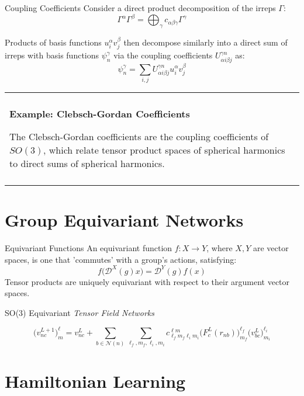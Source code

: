 \documentclass[11pt]{beamer}
\newenvironment{boxed2}
    {\begin{center}
    \begin{tabular}{|p{0.95\textwidth}|}
    \hline\\
    }
    { 
    \\\\\hline
    \end{tabular} 
    \end{center}
    }
\begin{document}
\begin{frame}{Coupling Coefficients}
Consider a direct product decomposition of the irreps $\Gamma$:
$$
\Gamma^{\alpha}\Gamma^{\beta}=\bigoplus_{\gamma}c_{\alpha\beta\gamma}\Gamma^{\gamma}
$$
	
Products of basis functions $u^{\alpha}_iv^{\beta}_j$ then decompose similarly into a direct sum of irreps with basis functions $\psi_{n}^{\gamma}$ via the coupling coefficients $U_{\alpha i \beta j}^{\gamma n}$ as:
$$
\psi_{n}^{\gamma}= \sum_{i,j}U_{\alpha i \beta j}^{\gamma n}u^{\alpha}_iv^{\beta}_j
$$

	\begin{boxed2}
	
	\vspace{-.41cm}
	
	\textbf{Example: Clebsch-Gordan Coefficients} 
	
	The Clebsch-Gordan coefficients are the coupling coefficients of $SO(3)$, which relate tensor product spaces of spherical harmonics to direct sums of spherical harmonics.
	
	\vspace{-.3cm}
	
\end{boxed2}

\end{frame}

\section{Group Equivariant Networks}
\begin{frame}{Equivariant Functions}
	An equivariant function $f:X\rightarrow Y$, where $X,Y$ are vector spaces, is one that 'commutes' with a group's actions, satisfying:
	$$
	f\Big(\mathcal{D}^X(g)x\Big)=\mathcal{D}^Y(g)f(x)
	$$
	Tensor products are uniquely equivariant with respect to their argument vector spaces.
\end{frame}
\begin{frame}{SO(3) Equivariant \textit{Tensor Field Networks}}

	$$
	\big(v^{L+1}_{nc}\big) ^{\ell}_{m}=v^{L}_{nc}+\sum_{b\in \mathcal{N}(n)}\sum_{\ell_f, m_f , \ell_i,m_i}c_{\ell_fm_f\ell_im_i}^{\ell m}\big(F^{L}_c(r_{nb})\big)^{\ell_f}_{m_f}\big(v_{bc}^L \big)^{\ell_i}_{m_i}
	$$
\end{frame}

\section{Hamiltonian Learning}
\end{document}
